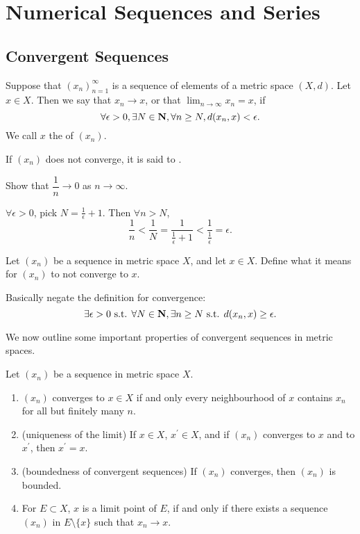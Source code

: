 \chapter{Numerical Sequences and Series}\label{chap:num-seq-series}
\section{Convergent Sequences}
\begin{definition}[Convergence]
Suppose that $(x_n)_{n=1}^\infty$ is a sequence of elements of a metric space $(X,d)$. Let $x\in X$. Then we say that $x_n\to x$, or that $\displaystyle\lim_{n\to\infty}x_n=x$, if
\[\forall\epsilon>0,\exists N\in\mathbf N,\forall n\ge N,d(x_n,x)<\epsilon.\]
We call $x$ the  of $(x_n)$.
\end{definition}

If $(x_n)$ does not converge, it is said to .

\begin{exercise}
Show that $\dfrac{1}{n}\to 0$ as $n\to\infty$.
\end{exercise}

\begin{solution}
$\forall\epsilon>0$, pick $N=\frac{1}{\epsilon}+1$. Then $\forall n>N$,
\[ \frac{1}{n}<\frac{1}{N}=\frac{1}{\frac{1}{\epsilon}+1}<\frac{1}{\frac{1}{\epsilon}}=\epsilon. \]
\end{solution}

\begin{exercise}
Let $(x_n)$ be a sequence in metric space $X$, and let $x\in X$. Define what it means for $(x_n)$ to not converge to $x$.
\end{exercise}

\begin{solution}
Basically negate the definition for convergence:
\[\exists\epsilon>0\text{ s.t. }\forall N\in\mathbf N,\exists n\ge N\text{ s.t. } d(x_n,x)\ge\epsilon.\]
\end{solution}

We now outline some important properties of convergent sequences in metric spaces.

\begin{proposition}
Let $(x_n)$ be a sequence in metric space $X$.
\begin{enumerate}[label=(\arabic*)]
\item $(x_n)$ converges to $x\in X$ if and only every neighbourhood of $x$ contains $x_n$ for all but finitely many $n$.
\item (uniqueness of the limit) If $x\in X$, $x^\prime\in X$, and if $(x_n)$ converges to $x$ and to $x^\prime$, then $x^\prime=x$.
\item (boundedness of convergent sequences) If $(x_n)$ converges, then $(x_n)$ is bounded.
\item For $E\subset X$, $x$ is a limit point of $E$, if and only if there exists a sequence $(x_n)$ in $E\setminus\{x\}$ such that $x_n\to x$.
\end{enumerate}
\end{proposition}


